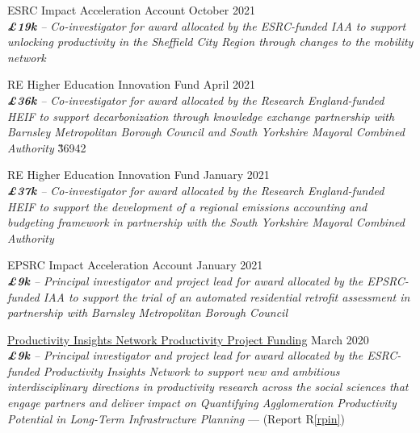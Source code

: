 \documentclass[10pt]{article}
\newcommand{\blankline}{\quad\pagebreak[3]}
\begin{document}
\blankline

ESRC Impact Acceleration Account \hfill {October 2021}\\
\emph{\textbf{\pounds19k} -- Co-investigator for award allocated by the ESRC-funded IAA to support unlocking productivity in the Sheffield City Region through changes to the mobility network}
\FPset{}
\FPset{}

\blankline

RE Higher Education Innovation Fund \hfill {April 2021}\\
\emph{\textbf{\pounds36k} -- Co-investigator for award allocated by the Research England-funded HEIF to support decarbonization through knowledge exchange partnership with Barnsley Metropolitan Borough Council and South Yorkshire Mayoral Combined Authority}
\FPset\v{36942}
\FPset{}

\blankline

RE Higher Education Innovation Fund \hfill {January 2021}\\
\emph{\textbf{\pounds37k} -- Co-investigator for award allocated by the Research England-funded HEIF to support the development of a regional emissions accounting and budgeting framework in partnership with the South Yorkshire Mayoral Combined Authority}
\FPset{}
\FPset{}

\blankline

EPSRC Impact Acceleration Account \hfill {January 2021}\\
\emph{\textbf{\pounds9k} -- Principal investigator and project lead for award allocated by the EPSRC-funded IAA to support the trial of an automated residential retrofit assessment in partnership with Barnsley Metropolitan Borough Council}
\FPset{}
\FPset{}

\blankline

\href{https://productivityinsightsnetwork.co.uk/projects/}{Productivity Insights Network Productivity Project Funding} \hfill {March 2020}\\
\emph{\textbf{\pounds9k} -- Principal investigator and project lead for award allocated by the ESRC-funded Productivity Insights Network to support new and ambitious interdisciplinary directions in productivity research across the social sciences that engage partners and deliver impact on Quantifying Agglomeration Productivity Potential in Long-Term Infrastructure Planning} --- (Report R\ref{rpin})
\FPset{}
\FPset{}

\blankline
\end{document}

